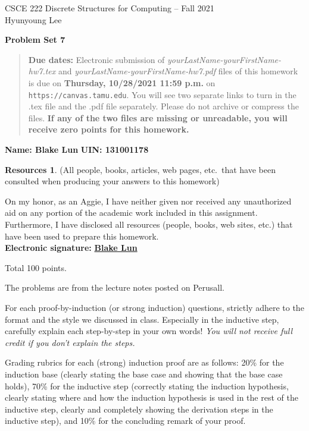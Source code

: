 \documentclass{article}
\theoremstyle{definition}
\newtheorem*{resources}{Resources}
\newcommand{\name}[2]{\noindent\textbf{Name: #1}\hfill \textbf{UIN: #2}}
\newcommand{\honor}{\noindent On my honor, as an Aggie, I have neither
  given nor received any unauthorized aid on any portion of the
  academic work included in this assignment. Furthermore, I have
  disclosed all resources (people, books, web sites, etc.) that have
  been used to prepare this homework. \\[2ex]
 \textbf{Electronic signature:} \underline{ \textbf{Blake Lun} } }
\newcommand{\problemset}[1]{\begin{center}\textbf{Problem Set #1}\end{center}}
\newcommand{\duedate}[1]{\begin{quote}\textbf{Due dates:} Electronic
    submission of \textsl{yourLastName-yourFirstName-hw7.tex} and 
    \textsl{yourLastName-yourFirstName-hw7.pdf} files of this homework is due on
    \textbf{#1} on \texttt{https://canvas.tamu.edu}. You will see two separate links
    to turn in the .tex file and the .pdf file separately. Please do not archive or compress the files.  
    \textbf{If any of the two files are missing or unreadable, you will receive zero points for this
    homework.}\end{quote} }
\begin{document}
\vspace*{-20mm}
\begin{center}
{\large
CSCE 222 Discrete Structures for Computing -- Fall 2021\\[.5ex]
Hyunyoung Lee\\}
\end{center}
\problemset{7}
\duedate{Thursday, 10/28/2021 11:59 p.m.}
\name{ Blake Lun }{ 131001178 }
\begin{resources} (All people, books, articles, web pages, etc.\ that
  have been consulted when producing your answers to this homework)
\end{resources}
\honor

\bigskip

\noindent
Total 100 points.

\bigskip

\noindent
The problems are from the lecture notes posted on Perusall.

\medskip

\noindent
For each proof-by-induction (or strong induction) questions, strictly adhere 
to the format and the style we discussed in class.  Especially in the inductive step, 
carefully explain each step-by-step in your own words!  \textit{You will not receive 
full credit if you don't explain the steps.}

Grading rubrics for each (strong) induction proof are as follows: 20\% for the induction base
(clearly stating the base case and showing that the base case holds), 70\% for the
inductive step (correctly stating the induction hypothesis, clearly stating where
and how the induction hypothesis is used in the rest of the inductive step, clearly
and completely showing the derivation steps in the inductive step), and 10\% for the 
concluding remark of your proof. 

\medskip
\end{document}

